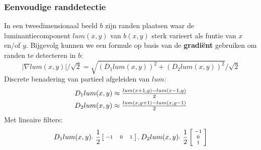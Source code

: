 \documentclass[dutch]{beamer}
\theoremstyle{definition}
\theoremstyle{remark}
\theoremstyle{example}
\begin{document}
\frame
{
  \frametitle{Eenvoudige randdetectie}
  
  In een tweedimensionaal beeld $b$ zijn randen plaatsen waar de luminantiecomponent
  $lum(x,y)$ van $b(x,y)$ sterk varieert als funtie van $x$ en/of $y$. Bijgevolg
  kunnen we een formule op basis van de \textbf{gradi\"ent} gebruiken om randen te 
  detecteren in $b$:
  \begin{displaymath}
  |\nabla lum(x,y)| / \sqrt{2} = \sqrt{(D_1 lum(x,y))^2 + (D_2 lum(x,y))^2} / \sqrt{2}
  \end{displaymath}
  Discrete benadering van partieel afgeleiden van $lum$:
  \begin{displaymath}
  \begin{array}{c}
  D_1 lum(x,y) \approx \frac{lum(x+1,y) - lum(x-1,y)}{2}\vspace{4pt}\\
  D_2 lum(x,y) \approx \frac{lum(x,y+1) - lum(x,y-1)}{2}
  \end{array}
  \end{displaymath}
  Met lineaire filters:
  \begin{displaymath}
  \scriptsize
  D_1 lum(x,y)\text{: } \frac{1}{2} \left[ \begin{array}{@{\ }ccc@{\ }} -1 & 0 & 1 \end{array} \right] \text{, } 
  D_2 lum(x,y)\text{: } \frac{1}{2} \left[ \begin{array}{@{\ }c@{\ }} -1 \\ 0 \\ 1 \end{array} \right]
  \end{displaymath}
}
\frame
\end{document}
